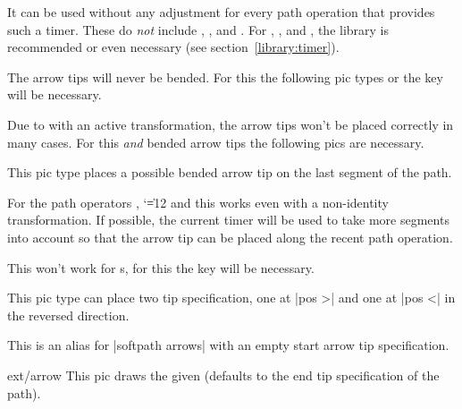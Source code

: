 \begin{multicols}{2}
\begin{description}
  It can be used without any adjustment for every path operation that provides such a timer.
  These do \emph{not} include
  ,
  ,
   and
  .
  For ,
      ,
       and
      ,
  the  library is recommended or even necessary
  (see section~\ref{library:timer}).
  
  The arrow tips will never be bended. For this the following pic types
  or the  key will be necessary.

  Due to \cite{PgfIssueSloped} with an active transformation,
  the arrow tips won't be placed correctly in many cases.
  For this \emph{and} bended arrow tips the following pics are necessary.
  
\item[|ext/softpath arrows|]
  This pic type places a possible bended arrow tip on the last segment of the path.
  
  For the path operators ,
  {\catcode`\|=12 
              and }
  this works even with a non-identity transformation.
  If possible, the current timer will be used to take more segments into account so
  that the arrow tip can be placed along the recent path operation.
  
  This won't work for s,
  for this the  key will be necessary.
  
  This pic type can place two tip specification,
  one at |pos >| and one at |pos <| in the reversed direction.

\item[|ext/softpath arrow|]
  This is an alias for |softpath arrows| with an empty start arrow tip specification.

\end{description}
\begin{pictype}{ext/arrow}{}
  This pic draws the given 
  (defaults to the end tip specification of the path).
  

\end{pictype}
\end{multicols}
